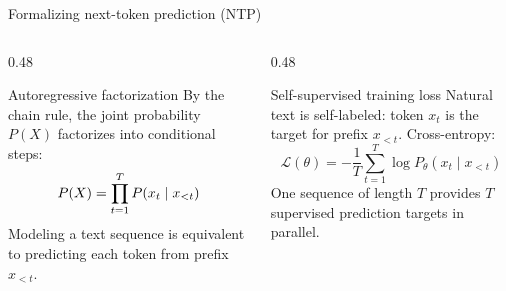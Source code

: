 \documentclass[handout]{beamer}
\begin{document}
\begin{frame}{Formalizing next-token prediction (NTP)}
  \begin{columns}[T]
    \begin{column}{0.48\linewidth}
      \begin{block}{Autoregressive factorization}
        By the chain rule, the joint probability $P(X)$ factorizes into conditional steps:
        \[
          P(X) = \prod_{t=1}^{T} P(x_t \mid x_{<t}) \vphantom{\frac{1}{T}}
        \]
        Modeling a text sequence is equivalent to predicting each token from prefix $x_{<t}$.
      \end{block}
    \end{column}
    \begin{column}{0.48\linewidth}
      \begin{block}{Self-supervised training loss}
        Natural text is self-labeled: token $x_t$ is the target for prefix $x_{<t}$. Cross-entropy:
        \[
          \mathcal{L}(\theta) = -\frac{1}{T}\sum_{t=1}^{T} \log P_\theta(x_t \mid x_{<t})
        \]
        One sequence of length $T$ provides $T$ supervised prediction targets in parallel.
      \end{block}
    \end{column}
  \end{columns}
  \vfill
\end{frame}
\end{document}
